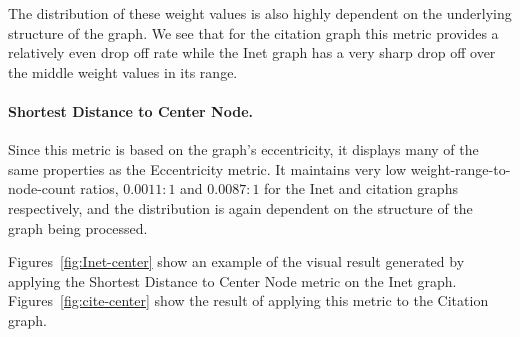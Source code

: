 The distribution of these weight values is also highly dependent on the underlying structure of the graph.  We see that for the citation graph this metric provides a relatively even drop off rate while the Inet graph has a very sharp drop off over the middle weight values in its range.

\paragraph*{Shortest Distance to Center Node.}
Since this metric is based on the graph's eccentricity, it displays many of the same properties as the Eccentricity metric.  It maintains very low weight-range-to-node-count ratios, $0.0011:1$ and $0.0087:1$ for the Inet and citation graphs respectively, and the distribution is again dependent on the structure of the graph being processed.

Figures~\ref{fig:Inet-center} show an example of the visual result generated by applying the Shortest Distance to Center Node metric on the Inet graph.  Figures~\ref{fig:cite-center} show the result of applying this metric to the Citation graph.

